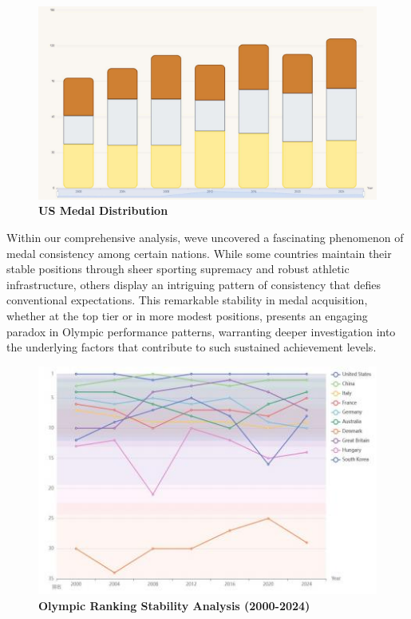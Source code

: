 \documentclass[12pt,a4paper]{article}
\begin{document}
    \begin{figure}[htbp]
        \centering
        \includegraphics[width=\textwidth]{./media/media/image4.png}
        \caption{\textbf{US Medal Distribution}}
        \label{fig:usmedaldistribution}
    \end{figure}
    
    Within our comprehensive analysis, we\textquotesingle ve
    uncovered a fascinating phenomenon of medal consistency among certain
    nations. While some countries maintain their stable positions through
    sheer sporting supremacy and robust athletic infrastructure, others
    display an intriguing pattern of consistency that defies conventional
    expectations. This remarkable stability in medal acquisition, whether at
    the top tier or in more modest positions, presents an engaging paradox
    in Olympic performance patterns, warranting deeper investigation into
    the underlying factors that contribute to such sustained achievement
    levels.
    \begin{figure}[htbp]
        \centering
        \includegraphics[width=\textwidth]{./media/media/image5.jpeg}
        \caption{\textbf{Olympic Ranking Stability Analysis (2000-2024)}}
        \label{fig:olymprankingstability}
    \end{figure}
    
\end{document}
